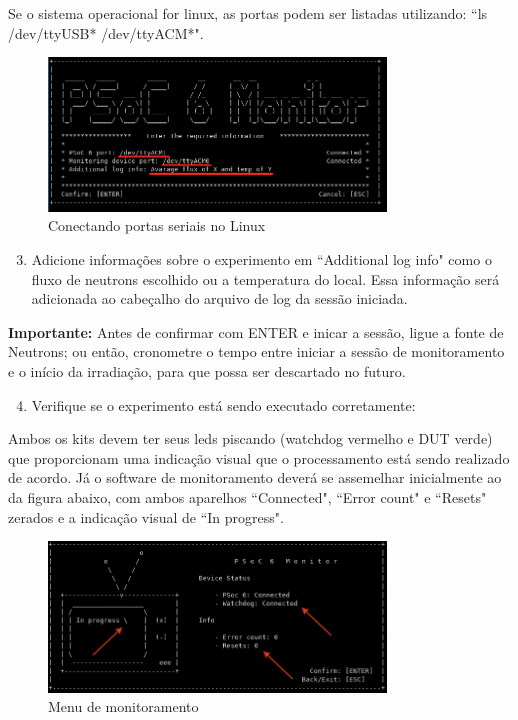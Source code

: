 \documentclass[12pt, a4paper]{article}
\begin{document}
Se o sistema operacional for linux, as portas podem ser listadas utilizando: ``ls /dev/ttyUSB* /dev/ttyACM*".

\begin{figure}[H]
    \centering
    \caption{Conectando portas seriais no Linux}
    \includegraphics[width=0.8\textwidth]{../imgs/serial_linux.png}

    \vspace{0.5em}
    \label{fig:serial_linux}
\end{figure}

\begin{enumerate}[leftmargin=1.3cm]
    \setcounter{enumi}{2}
    \item Adicione informações sobre o experimento em ``Additional log info" como o fluxo de neutrons escolhido ou a temperatura do local. Essa informação será adicionada ao cabeçalho do arquivo de log da sessão iniciada.
\end{enumerate}

\textbf{Importante:} Antes de confirmar com ENTER e inicar a sessão, ligue a fonte de Neutrons; ou então, cronometre o tempo entre iniciar a sessão de monitoramento e o início da irradiação, para que possa ser descartado no futuro.

\begin{enumerate}[leftmargin=1.3cm]
    \setcounter{enumi}{3}
    \item Verifique se o experimento está sendo executado corretamente:
\end{enumerate}

Ambos os kits devem ter seus leds piscando (watchdog vermelho e DUT verde) que proporcionam uma indicação visual que o processamento está sendo realizado de acordo. Já o software de monitoramento deverá se assemelhar inicialmente ao da figura abaixo, com ambos aparelhos ``Connected", ``Error count" e ``Resets" zerados e a indicação visual de ``In progress".

\begin{figure}[H]
    \centering
    \caption{Menu de monitoramento}
    \includegraphics[width=0.8\textwidth]{../imgs/monitoring.png}

    \vspace{0.5em}
    \label{fig:monitoring_menu}
\end{figure}
\end{document}
